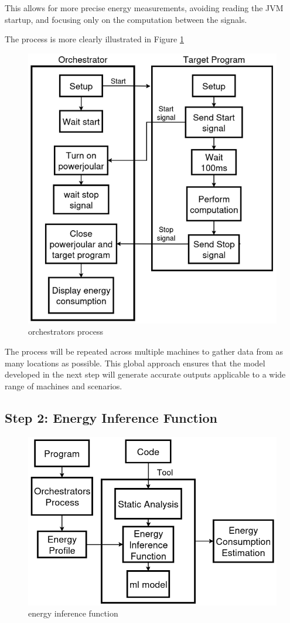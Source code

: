 \documentclass[sigplan]{acmart}
\begin{document}
This allows for more precise energy measurements, avoiding reading the JVM startup, and focusing only on the computation between the signals.

The process is more clearly illustrated in Figure \ref{fig:orchestrators_process}

\begin{figure}%
  \centering
  \includegraphics[width = 0.4 \textwidth]{figures/orchestrators_process.png}
  \caption{orchestrators process}
  \label{fig:orchestrators_process}
\end{figure}

The process will be repeated across multiple machines to gather data from as many locations as possible. This global approach ensures that the model developed in the next step will generate accurate outputs applicable to a wide range of machines and scenarios.

\subsection{Step 2: Energy Inference Function} \label{sec:work_step2_energy_inference_function}

\begin{figure}%
  \centering
  \includegraphics[width = 0.4 \textwidth]{figures/energy_inf_fun.png}
  \caption{energy inference function}
  \label{fig:energy_inference_function}
\end{figure}
\end{document}
